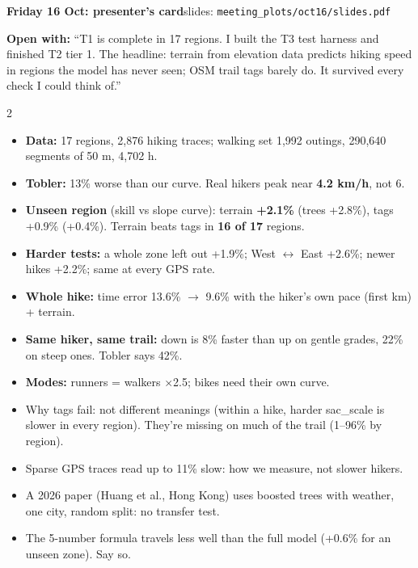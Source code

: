 \documentclass[10pt]{article}
\newcommand{\h}[1]{\vspace{4pt}{\large\bfseries #1}\par\vspace{2pt}}
\begin{document}
{\LARGE\bfseries Friday 16 Oct: presenter's card}\hfill{\small slides: \texttt{meeting\_plots/oct16/slides.pdf}}

\vspace{4pt}
\textbf{Open with:} ``T1 is complete in 17 regions. I built the T3 test
harness and finished T2 tier 1. The headline: terrain from elevation data
predicts hiking speed in regions the model has never seen; OSM trail tags
barely do. It survived every check I could think of.''

\begin{multicols}{2}
\h{Numbers to know}
\begin{itemize}
\item \textbf{Data:} 17 regions, 2,876 hiking traces; walking set 1,992
  outings, 290,640 segments of 50 m, 4,702 h.
\item \textbf{Tobler:} 13\% worse than our curve. Real hikers peak near
  \textbf{4.2 km/h}, not 6.
\item \textbf{Unseen region} (skill vs slope curve): terrain
  \textbf{+2.1\%} (trees +2.8\%), tags +0.9\% (+0.4\%). Terrain beats
  tags in \textbf{16 of 17} regions.
\item \textbf{Harder tests:} a whole zone left out +1.9\%; West
  $\leftrightarrow$ East +2.6\%; newer hikes +2.2\%; same at every GPS
  rate.
\item \textbf{Whole hike:} time error 13.6\% $\to$ 9.6\% with the hiker's
  own pace (first km) + terrain.
\item \textbf{Same hiker, same trail:} down is 8\% faster than up on gentle
  grades, 22\% on steep ones. Tobler says 42\%.
\item \textbf{Modes:} runners = walkers $\times$2.5; bikes need their own
  curve.
\end{itemize}

\h{New since last week}
\begin{itemize}
\item Why tags fail: not different meanings (within a hike, harder
  sac\_scale is slower in every region). They're missing on much of the
  trail (1--96\% by region).
\item Sparse GPS traces read up to 11\% slow: how we measure, not slower
  hikers.
\item A 2026 paper (Huang et al., Hong Kong) uses boosted trees with
  weather, one city, random split: no transfer test.
\item The 5-number formula travels less well than the full model (+0.6\%
  for an unseen zone). Say so.
\end{itemize}


\end{multicols}
\end{document}
